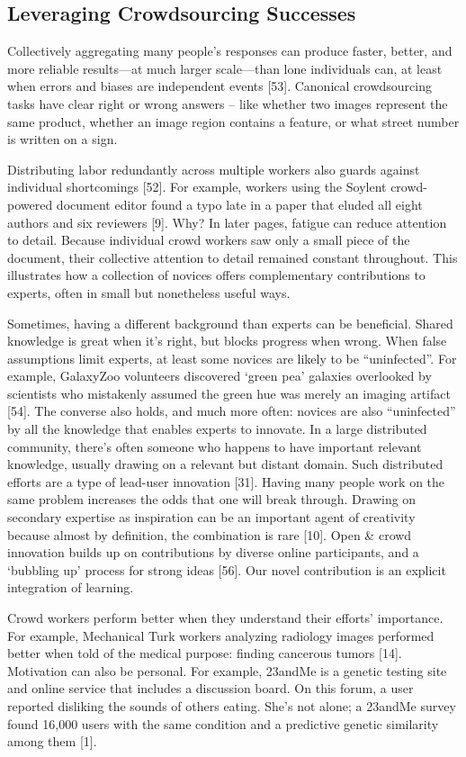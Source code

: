 \subsection{Leveraging Crowdsourcing Successes}
Collectively aggregating many people’s responses can produce faster, better, and more reliable results—at much larger scale—than lone individuals can, at least when errors and biases are independent events [53]. Canonical crowdsourcing tasks have clear right or wrong answers – like whether two images represent the same product, whether an image region contains a feature, or what street number is written on a sign.

Distributing labor redundantly across multiple workers also guards against individual shortcomings [52]. For example, workers using the Soylent crowd-powered document editor found a typo late in a paper that eluded all eight authors and six reviewers [9]. Why? In later pages, fatigue can reduce attention to detail. Because individual crowd workers saw only a small piece of the document, their collective attention to detail remained constant throughout. This illustrates how a collection of novices offers complementary contributions to experts, often in small but nonetheless useful ways. 

Sometimes, having a different background than experts can be beneficial. Shared knowledge is great when it’s right, but blocks progress when wrong. When false assumptions limit experts, at least some novices are likely to be “uninfected”. For example, GalaxyZoo volunteers discovered ‘green pea’ galaxies overlooked by scientists who mistakenly assumed the green hue was merely an imaging artifact [54]. The converse also holds, and much more often: novices are also “uninfected” by all the knowledge that enables experts to innovate. In a large distributed community, there’s often someone who happens to have important relevant knowledge, usually drawing on a relevant but distant domain. Such distributed efforts are a type of lead-user innovation [31]. Having many people work on the same problem increases the odds that one will break through. Drawing on secondary expertise as inspiration can be an important agent of creativity because almost by definition, the combination is rare [10]. Open \& crowd innovation builds up on contributions by diverse online participants, and a ‘bubbling up’ process for strong ideas [56]. Our novel contribution is an explicit integration of learning.

Crowd workers perform better when they understand their efforts’ importance. For example, Mechanical Turk workers analyzing radiology images performed better when told of the medical purpose: finding cancerous tumors [14]. Motivation can also be personal. For example, 23andMe is a genetic testing site and online service that includes a discussion board. On this forum, a user reported disliking the sounds of others eating. She’s not alone; a 23andMe survey found 16,000 users with the same condition and a predictive genetic similarity among them [1].

